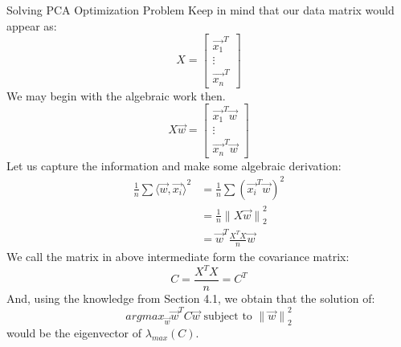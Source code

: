 \begin{ln-explain}{Solving PCA Optimization Problem}{}
    Keep in mind that our data matrix would appear as:
    \[
        X = \begin{bmatrix} \vec{x_1}^T \\ \vdots \\ \vec{x_n}^T \end{bmatrix}
    \]
    We may begin with the algebraic work then.
    \[
        X \vec{w} = \begin{bmatrix} \vec{x_1}^T \vec{w} \\ \vdots \\ \vec{x_n}^T \vec{w} \end{bmatrix}
    \]
    Let us capture the information and make some algebraic derivation:
    \begin{align*}
        \frac{1}{n} \sum {\langle \vec{w}, \vec{x_i} \rangle}^2
        &= \frac{1}{n} \sum {(\vec{x_i}^T \vec{w})}^2 \\
        &= \frac{1}{n} {\lVert X \vec{w} \rVert}_2^2 \\
        &= \vec{w}^T \frac{X^T X}{n} \vec{w}
    \end{align*}
    We call the matrix in above intermediate form the covariance matrix:
    \[
        C = \frac{X^T X}{n} = C^T
    \]
    And, using the knowledge from Section 4.1, we obtain that the solution of:
    \[
        {argmax}_{\vec{w}} \vec{w}^T C \vec{w} \text{ subject to } {\lVert \vec{w} \rVert}_2^2
    \]
    would be the eigenvector of $\lambda_{max}(C)$.
\end{ln-explain}
